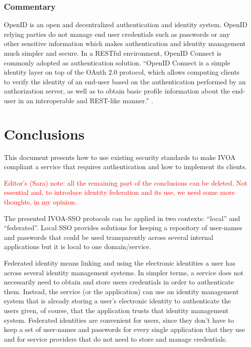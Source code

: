 \documentclass[11pt,a4paper]{ivoa}
\begin{document}
\subsubsection{Commentary}
OpenID is an open and decentralized authentication and identity system.
OpenID relying parties do not manage end user credentials
such as passwords or any other sensitive information which makes
authentication and identity management much simpler and secure.
In a RESTful environment, OpenID Connect \citep{std:openidconnect} is
commonly adopted as authentication solution. ``OpenID Connect  is a
simple identity
layer on top of the OAuth 2.0 protocol, which allows computing clients
to verify the identity of an end-user based on the authentication
 performed by an authorization server, as well as to obtain basic
 profile information about the end-user in an interoperable and
 REST-like manner.'' \citep{std:openid}.

\section{Conclusions}
This document presents how to use existing security standards to make
IVOA compliant a service that requires authentication and how to 
implement its clients.

\textcolor{red}{Editor's (Sara) note: all the remaining part of the 
conclusions can be deleted. Not essential and, to introduce identity 
federation and its use, we need some more thoughts, in my opinion.}

The presented IVOA-SSO protocols can be applied in two contexts:
``local'' and ``federated''.
Local SSO  provides solutions for keeping a repository of user-names
and passwords that could be used transparently across several internal
applications but it is local to one domain/service.

Federated identity means linking and using the electronic identities a
user has across several identity management systems.
In simpler terms, a service does not necessarily need to obtain and
store users credentials in order to authenticate them. Instead, the
service (or the application) can use an identity management system that
is already storing a user's electronic identity
to authenticate the users given, of course, that the application trusts
that identity management system.
Federated identities are convenient for users, since they don't have to
keep a set of user-names and passwords for every single application that
they use and for service providers that do not need to store and manage
credentials.
\end{document}

